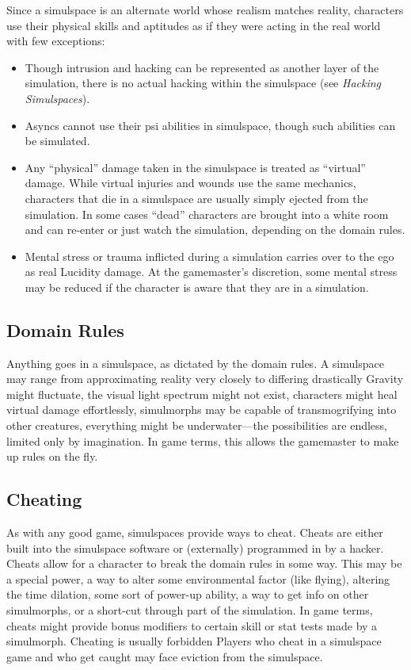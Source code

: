 Since a simulspace is an alternate world whose realism 
matches reality, characters use their physical skills and 
aptitudes as if they were acting in the real world with 
few exceptions:
\begin{itemize}
\item  Though intrusion and hacking can be represented 
as another layer of the simulation, there is no 
actual hacking within the simulspace (see \textit{Hacking Simulspaces}).

\item  Asyncs cannot use their psi abilities in simulspace, 
though such abilities can be simulated.

\item  Any ``physical'' damage taken in the simulspace is 
treated as ``virtual'' damage. While virtual injuries 
and wounds use the same mechanics, characters 
that die in a simulspace are usually simply ejected 
from the simulation. In some cases ``dead'' characters are brought into a white room and can 
re-enter or just watch the simulation, depending 
on the domain rules.

\item  Mental stress or trauma inflicted during a simulation carries over to the ego as real Lucidity 
damage. At the gamemaster's discretion, some 
mental stress may be reduced if the character is 
aware that they are in a simulation.
\end{itemize}


\subsection{Domain Rules}

Anything goes in a simulspace, as dictated by 
the domain rules. A simulspace may range from 
approximating reality very closely to differing drastically
Gravity might fluctuate, the visual light spectrum
might not exist, characters might heal virtual
damage effortlessly, simulmorphs may be capable of 
transmogrifying into other creatures, everything might 
be underwater—the possibilities are endless, limited 
only by imagination. In game terms, this allows the 
gamemaster to make up rules on the fly.

\subsection{Cheating}

As with any good game, simulspaces provide ways 
to cheat. Cheats are either built into the simulspace 
software or (externally) programmed in by a hacker. 
Cheats allow for a character to break the domain rules 
in some way. This may be a special power, a way to 
alter some environmental factor (like flying), altering 
the time dilation, some sort of power-up ability, a 
way to get info on other simulmorphs, or a short-cut 
through part of the simulation. In game terms, cheats 
might provide bonus modifiers to certain skill or stat 
tests made by a simulmorph. Cheating is usually forbidden
Players who cheat in a simulspace game and
who get caught may face eviction from the simulspace.

